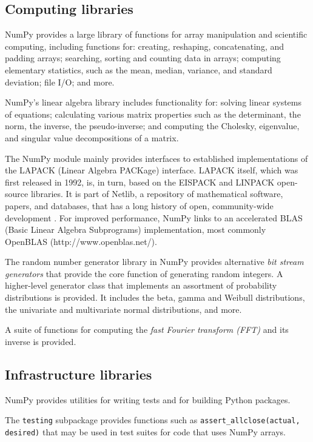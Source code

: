 \subsection*{Computing libraries}

NumPy provides a large library of functions for array manipulation
and scientific computing, including functions for: creating, reshaping,
concatenating, and padding arrays; searching, sorting and counting data
in arrays; computing elementary statistics, such as the mean, median,
variance, and standard deviation; file I/O; and more.

NumPy's linear algebra library includes functionality for: solving
linear systems of equations; calculating various matrix properties
such as the determinant, the norm, the inverse, the pseudo-inverse;
and computing the Cholesky, eigenvalue, and singular value
decompositions of a matrix.

The NumPy module mainly provides interfaces to established
implementations of the LAPACK (Linear Algebra PACKage) \cite{LAPACK}
interface.  LAPACK itself, which was first released in 1992, is, in
turn, based on the EISPACK and LINPACK open-source libraries. It is
part of Netlib, a repository of mathematical software, papers, and
databases, that has a long history of open, community-wide
development \cite{dongarra1990lapack,dongarra2008netlib}. For improved
performance, NumPy links to an accelerated BLAS (Basic Linear Algebra
Subprograms) implementation, most commonly OpenBLAS
(http://www.openblas.net/).

The random number generator library in NumPy provides alternative
\emph{bit stream generators} that provide the core function of generating
random integers.
A higher-level generator class that implements an assortment of
probability distributions is provided. It includes the beta, gamma
and Weibull distributions, the univariate and multivariate normal
distributions, and more.

A suite of functions for computing the \emph{fast Fourier transform (FFT)}
and its inverse is provided.

\subsection*{Infrastructure libraries}

NumPy provides utilities for writing tests and for building Python packages.

The \texttt{testing} subpackage provides functions such as
\texttt{assert\_allclose(actual, desired)} that may be used in
test suites for code that uses NumPy arrays.

